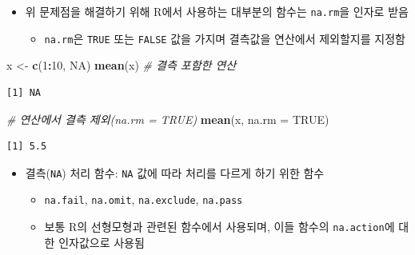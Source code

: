 \documentclass[11pt,a4paper]{book}
\newenvironment{Shaded}{\begin{snugshade}}{\end{snugshade}}
\newcommand{\KeywordTok}[1]{\textcolor[rgb]{0.13,0.29,0.53}{\textbf{#1}}}
\newcommand{\DataTypeTok}[1]{\textcolor[rgb]{0.13,0.29,0.53}{#1}}
\newcommand{\DecValTok}[1]{\textcolor[rgb]{0.00,0.00,0.81}{#1}}
\newcommand{\StringTok}[1]{\textcolor[rgb]{0.31,0.60,0.02}{#1}}
\newcommand{\CommentTok}[1]{\textcolor[rgb]{0.56,0.35,0.01}{\textit{#1}}}
\newcommand{\OtherTok}[1]{\textcolor[rgb]{0.56,0.35,0.01}{#1}}
\newcommand{\OperatorTok}[1]{\textcolor[rgb]{0.81,0.36,0.00}{\textbf{#1}}}
\newcommand{\NormalTok}[1]{#1}
\providecommand{\tightlist}{%
  \setlength{\itemsep}{0pt}\setlength{\parskip}{0pt}}
\theoremstyle{definition}
\theoremstyle{definition}
\theoremstyle{definition}
\theoremstyle{remark}
\begin{document}
\normalsize

\begin{itemize}
\tightlist
\item
  위 문제점을 해결하기 위해 R에서 사용하는 대부분의 함수는
  \texttt{na.rm}을 인자로 받음

  \begin{itemize}
  \tightlist
  \item
    \texttt{na.rm}은 \texttt{TRUE} 또는 \texttt{FALSE} 값을 가지며
    결측값을 연산에서 제외할지를 지정함
  \end{itemize}
\end{itemize}

\footnotesize

\begin{Shaded}
\begin{Highlighting}[]
\NormalTok{x <-}\StringTok{ }\KeywordTok{c}\NormalTok{(}\DecValTok{1}\OperatorTok{:}\DecValTok{10}\NormalTok{, }\OtherTok{NA}\NormalTok{)}
\KeywordTok{mean}\NormalTok{(x)  }\CommentTok{# 결측 포함한 연산}
\end{Highlighting}
\end{Shaded}

\begin{verbatim}
[1] NA
\end{verbatim}

\begin{Shaded}
\begin{Highlighting}[]
\CommentTok{# 연산에서 결측 제외(na.rm = TRUE)}
\KeywordTok{mean}\NormalTok{(x, }\DataTypeTok{na.rm =} \OtherTok{TRUE}\NormalTok{)}
\end{Highlighting}
\end{Shaded}

\begin{verbatim}
[1] 5.5
\end{verbatim}

\normalsize

\begin{itemize}
\tightlist
\item
  결측(\texttt{NA}) 처리 함수: \texttt{NA} 값에 따라 처리를 다르게 하기
  위한 함수

  \begin{itemize}
  \tightlist
  \item
    \texttt{na.fail}, \texttt{na.omit}, \texttt{na.exclude},
    \texttt{na.pass}
  \item
    보통 R의 선형모형과 관련된 함수에서 사용되며, 이들 함수의
    \texttt{na.action}에 대한 인자값으로 사용됨
  \end{itemize}
\end{itemize}
\end{document}
